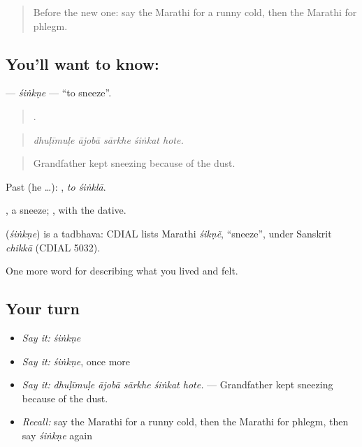\label{lesson:MR-C481-sinkne}



\begin{quote}
Before the new one: say the Marathi for a runny cold, then the Marathi for phlegm.
\end{quote}

\subsection*{You'll want to know: }
\textbf{} — \emph{śiṅkṇe} — \textquotedblleft{}to sneeze\textquotedblright{}.

\begin{quote}
    .
\end{quote}

\begin{quote}
\emph{dhuḷīmuḷe ājobā sārkhe śiṅkat hote.}
\end{quote}

\begin{quote}
Grandfather kept sneezing because of the dust.
\end{quote}

Past (he …):  , \emph{to śiṅklā}.

, a sneeze;  , with the dative.

\begin{cousinweb}
\textbf{} (\emph{śiṅkṇe}) is a tadbhava: CDIAL lists Marathi \emph{śikṇẽ}, \textquotedblleft{}sneeze\textquotedblright{}, under Sanskrit \emph{chikkā} (CDIAL 5032).
\end{cousinweb}

\begin{grammarlens}[title={What you've built}]
One more word for describing what you lived and felt.
\end{grammarlens}

\subsection*{Your turn}
\begin{itemize}
\raggedright
  \item \emph{Say it:} \emph{śiṅkṇe}
  \item \emph{Say it:} \emph{śiṅkṇe}, once more
  \item \emph{Say it:} \emph{dhuḷīmuḷe ājobā sārkhe śiṅkat hote.} — Grandfather kept sneezing because of the dust.
  \item \emph{Recall:} say the Marathi for a runny cold, then the Marathi for phlegm, then say \emph{śiṅkṇe} again
\end{itemize}

